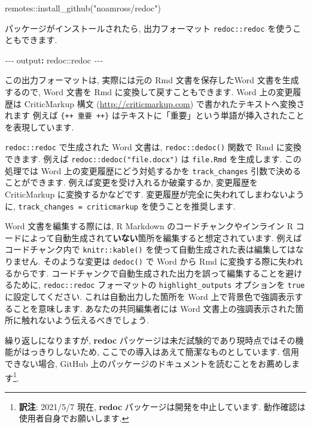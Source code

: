 \documentclass[
  11pt,
  lualatex,
  ja=standard]{bxjsreport}
\newenvironment{Shaded}{\begin{snugshade}}{\end{snugshade}}
\newcommand{\AttributeTok}[1]{\textcolor[rgb]{0.77,0.63,0.00}{#1}}
\newcommand{\FunctionTok}[1]{\textcolor[rgb]{0.00,0.00,0.00}{#1}}
\newcommand{\KeywordTok}[1]{\textcolor[rgb]{0.13,0.29,0.53}{\textbf{#1}}}
\newcommand{\NormalTok}[1]{#1}
\newcommand{\PreprocessorTok}[1]{\textcolor[rgb]{0.56,0.35,0.01}{\textit{#1}}}
\newcommand{\SpecialCharTok}[1]{\textcolor[rgb]{0.00,0.00,0.00}{#1}}
\newcommand{\StringTok}[1]{\textcolor[rgb]{0.31,0.60,0.02}{#1}}
\begin{document}
\begin{Shaded}
\begin{Highlighting}[]
\NormalTok{remotes}\SpecialCharTok{::}\FunctionTok{install\_github}\NormalTok{(}\StringTok{"noamross/redoc"}\NormalTok{)}
\end{Highlighting}
\end{Shaded}

パッケージがインストールされたら, 出力フォーマット \texttt{redoc::redoc} を使うこともできます.

\begin{Shaded}
\begin{Highlighting}[]
\PreprocessorTok{{-}{-}{-}}
\FunctionTok{output}\KeywordTok{:}\AttributeTok{ redoc::redoc}
\PreprocessorTok{{-}{-}{-}}
\end{Highlighting}
\end{Shaded}

この出力フォーマットは, 実際には元の Rmd 文書を保存したWord 文書を生成するので, Word 文書を Rmd に変換して戻すこともできます. Word 上の変更履歴は CriticMarkup 構文 (\url{http://criticmarkup.com}) で書かれたテキストへ変換されます 例えば \texttt{\{++ 重要 ++\}} はテキストに「重要」という単語が挿入されたことを表現しています.

\texttt{redoc::redoc} で生成された Word 文書は, \texttt{redoc::dedoc()} 関数で Rmd に変換できます. 例えば \texttt{redoc::dedoc("file.docx")} は \texttt{file.Rmd} を生成します. この処理では Word 上の変更履歴にどう対処するかを \texttt{track\_changes} 引数で決めることができます. 例えば変更を受け入れるか破棄するか, 変更履歴を CriticMarkup に変換するかなどです. 変更履歴が完全に失われてしまわないように, \texttt{track\_changes = \textquotesingle{}criticmarkup\textquotesingle{}} を使うことを推奨します.

Word 文書を編集する際には, R Markdown のコードチャンクやインライン R コードによって自動生成されて\textbf{いない}箇所を編集すると想定されています. 例えばコードチャンク内で \texttt{knitr::kable()} を使って自動生成された表は編集してはなりません. そのような変更は \texttt{dedoc()} で Word から Rmd に変換する際に失われるからです. コードチャンクで自動生成された出力を誤って編集することを避けるために, \texttt{redoc::redoc} フォーマットの \texttt{highlight\_outputs} オプションを \texttt{true}に設定してください. これは自動出力した箇所を Word 上で背景色で強調表示することを意味します. あなたの共同編集者には Word 文書上の強調表示された箇所に触れないよう伝えるべきでしょう.

繰り返しになりますが, \textbf{redoc} パッケージは未だ試験的であり現時点ではその機能がはっきりしないため, ここでの導入はあえて簡潔なものとしています. 信用できない場合, GitHub 上のパッケージのドキュメントを読むことをお薦めします\footnote{\textbf{訳注}: 2021/5/7 現在, \textbf{redoc} パッケージは開発を中止しています. 動作確認は使用者自身でお願いします.}.
\end{document}
